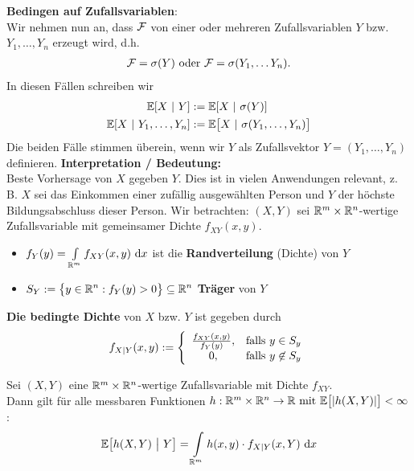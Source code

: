 \textbf{Bedingen auf Zufallsvariablen}:\\
Wir nehmen nun an, dass $\mathcal{F}$ von einer oder mehreren Zufallsvariablen $Y$ bzw. $Y_1,\ldots, Y_n$ erzeugt wird, d.h.
\begin{align*}
\mathcal{F}=\sigma(Y)\text{ oder }\mathcal{F}=\sigma(Y_1,\ldots Y_n).
\end{align*}
In diesen Fällen schreiben wir 
\begin{align*}
\mathbb{E}[X~|~Y]&:=\mathbb{E}[X~|~\sigma(Y)]\\
\mathbb{E}[X~|~Y_1,\ldots,Y_n]&:=\mathbb{E}\big[X~|~\sigma(Y_1,\ldots,Y_n)\big]
\end{align*}
Die beiden Fälle stimmen überein, wenn wir $Y$ als Zufallsvektor $Y=(Y_1,\ldots,Y_n)$ definieren.\nl
\textbf{Interpretation / Bedeutung:}\\
Beste Vorhersage von $X$ gegeben $Y$. Dies ist in vielen Anwendungen relevant, z. B. $X$ sei das Einkommen einer zufällig ausgewählten Person und $Y$ der höchste Bildungsabschluss dieser Person.\nl
Wir betrachten: $(X,Y)$ sei $\mathbb{R}^m\times\mathbb{R}^n$-wertige Zufallsvariable mit gemeinsamer Dichte $f_{XY}(x,y)$.
\begin{itemize}
\item
$ f_Y(y)=\int\limits_{\mathbb{R}^m}f_{XY}(x,y)\text{ d} x $ ist die \textbf{Randverteilung} (Dichte) von $Y$
\item 
$\begin{aligned}
S_Y:=\big\lbrace y\in\mathbb{R}^n:f_Y(y)>0\big\rbrace\subseteq\mathbb{R}^n
\end{aligned}$ \textbf{Träger} von $Y$
\end{itemize}

\begin{defi} %
\textbf{Die bedingte Dichte} von $X$ bzw. $Y$ ist gegeben durch 
\begin{align*}
f_{X|Y}(x,y):=\left\lbrace\begin{array}{cl}
\frac{f_{XY}(x,y)}{f_Y(y)}, &\text{falls } y\in S_y\\
0, &\text{falls } y\not\in S_y
\end{array}\right.
\end{align*}
\end{defi}

\begin{theorem} %
Sei $(X,Y)$ eine $\mathbb{R}^m\times\mathbb{R}^n$-wertige Zufallsvariable mit Dichte $f_{XY}$.\\
Dann gilt für alle messbaren Funktionen $h:\mathbb{R}^m\times\mathbb{R}^n\to\mathbb{R}\text{ mit }\mathbb{E}\big[|h(X,Y)|\big]<\infty$:
\begin{align*}
\mathbb{E}\big[ h(X,Y)~\big|~Y\big]=\int\limits_{\mathbb{R}^m} h(x,y)\cdot f_{X|Y}(x,Y)\text{ d} x
\end{align*}
\end{theorem}

